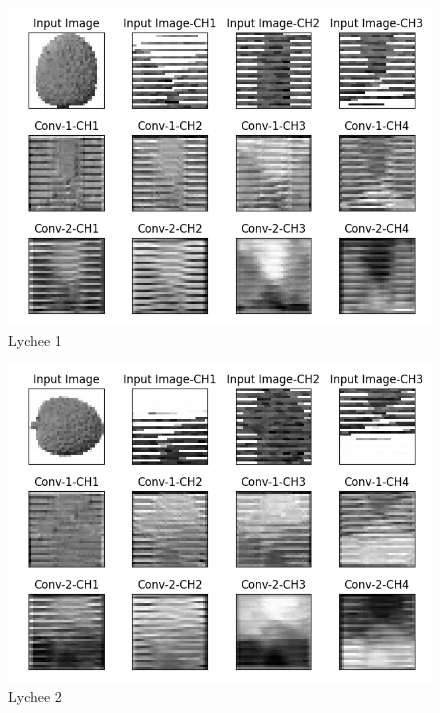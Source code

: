 \documentclass[a4paper, 10]{article}
\begin{document}
    \begin{figure}[H]
        \centering
        \includegraphics[width=\textwidth]{Lychee.png}
        \caption{Lychee 1} \label{fig:6}
    \end{figure}
    \begin{figure}[H]
        \centering
        \includegraphics[width=\textwidth]{Lychee1.png}
        \caption{Lychee 2} \label{fig:7}
    \end{figure}
\end{document}
